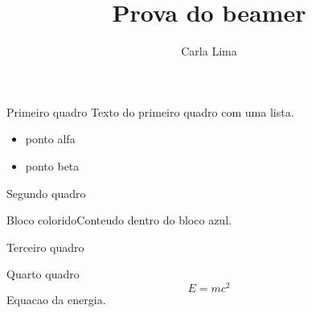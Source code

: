 \documentclass{beamer}
\title{Prova do beamer}
\author{Carla Lima}
\begin{document}
\begin{frame}\titlepage\end{frame}
\begin{frame}{Primeiro quadro}
Texto do primeiro quadro com uma lista.
\begin{itemize}\item ponto alfa\item ponto beta\end{itemize}
\end{frame}
\begin{frame}{Segundo quadro}
\begin{block}{Bloco colorido}Conteudo dentro do bloco azul.\end{block}
\end{frame}
\begin{frame}{Terceiro quadro}
\begin{center}\end{center}
\end{frame}
\begin{frame}{Quarto quadro}
\[ E = mc^2 \]
Equacao da energia.
\end{frame}
\end{document}
